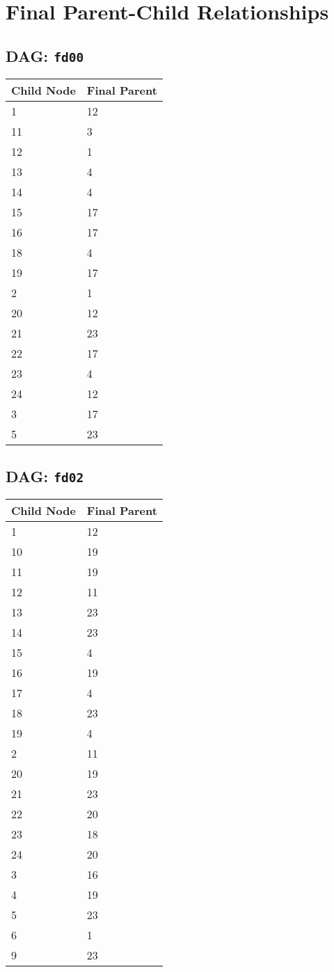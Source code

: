 \documentclass{article}
\begin{document}
\pagestyle{fancy}
\fancyhf{}
\section*{Final Parent-Child Relationships}
\subsection*{DAG: \texttt{fd00}}
\begin{tabular}{ll}
\toprule
\textbf{Child Node} & \textbf{Final Parent} \\
\midrule
1 & 12 \\
11 & 3 \\
12 & 1 \\
13 & 4 \\
14 & 4 \\
15 & 17 \\
16 & 17 \\
18 & 4 \\
19 & 17 \\
2 & 1 \\
20 & 12 \\
21 & 23 \\
22 & 17 \\
23 & 4 \\
24 & 12 \\
3 & 17 \\
5 & 23 \\
\bottomrule
\end{tabular}

\subsection*{DAG: \texttt{fd02}}
\begin{tabular}{ll}
\toprule
\textbf{Child Node} & \textbf{Final Parent} \\
\midrule
1 & 12 \\
10 & 19 \\
11 & 19 \\
12 & 11 \\
13 & 23 \\
14 & 23 \\
15 & 4 \\
16 & 19 \\
17 & 4 \\
18 & 23 \\
19 & 4 \\
2 & 11 \\
20 & 19 \\
21 & 23 \\
22 & 20 \\
23 & 18 \\
24 & 20 \\
3 & 16 \\
4 & 19 \\
5 & 23 \\
6 & 1 \\
9 & 23 \\
\bottomrule
\end{tabular}
\end{document}

